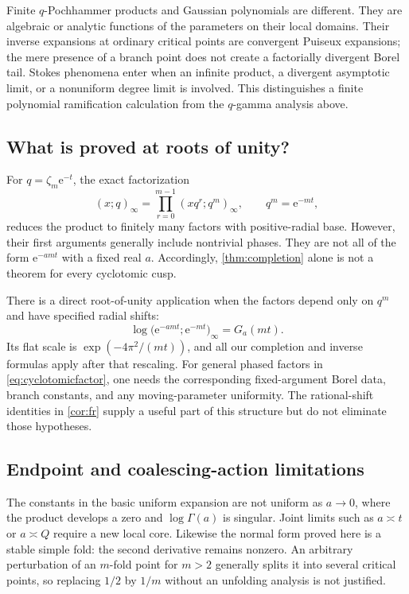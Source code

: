 \documentclass[11pt,a4paper]{article}
\numberwithin{equation}{section}
\theoremstyle{definition}
\theoremstyle{remark}
\newcommand{\e}{\mathrm e}
\begin{document}
Finite $q$-Pochhammer products and Gaussian polynomials are different.
They are algebraic or analytic functions of the parameters on their
local domains. Their inverse expansions at ordinary critical points
are convergent Puiseux expansions; the mere presence of a branch point
does not create a factorially divergent Borel tail. Stokes phenomena
enter when an infinite product, a divergent asymptotic limit, or a
nonuniform degree limit is involved. This distinguishes a finite
polynomial ramification calculation from the $q$-gamma analysis above.

\subsection{What is proved at roots of unity?}
For $q=\zeta_m\e^{-t}$, the exact factorization
\begin{equation}
 (x;q)_\infty=\prod_{r=0}^{m-1}(xq^r;q^m)_\infty,
 \qquad q^m=\e^{-mt},
 \label{eq:cyclotomicfactor}
\end{equation}
reduces the product to finitely many factors with positive-radial base.
However, their first arguments generally include nontrivial phases.
They are not all of the form $\e^{-amt}$ with a fixed real $a$.
Accordingly, \cref{thm:completion} alone is not a theorem for every
cyclotomic cusp.

There is a direct root-of-unity application when the factors depend
only on $q^m$ and have specified radial shifts:
\[
 \log\big(\e^{-am t};\e^{-mt}\big)_\infty=G_a(mt).
\]
Its flat scale is $\exp(-4\pi^2/(mt))$, and all our completion and
inverse formulas apply after that rescaling. For general phased
factors in \eqref{eq:cyclotomicfactor}, one needs the corresponding
fixed-argument Borel data, branch constants, and any moving-parameter
uniformity. The rational-shift identities in \cref{cor:fr} supply a
useful part of this structure but do not eliminate those hypotheses.

\subsection{Endpoint and coalescing-action limitations}
The constants in the basic uniform expansion are not uniform as
$a\to0$, where the product develops a zero and $\log\Gamma(a)$ is
singular. Joint limits such as $a\asymp t$ or $a\asymp Q$ require a
new local core. Likewise the normal form proved here is a stable
simple fold: the second derivative remains nonzero. An arbitrary
perturbation of an $m$-fold point for $m>2$ generally splits it into
several critical points, so replacing $1/2$ by $1/m$ without an
unfolding analysis is not justified.
\end{document}

